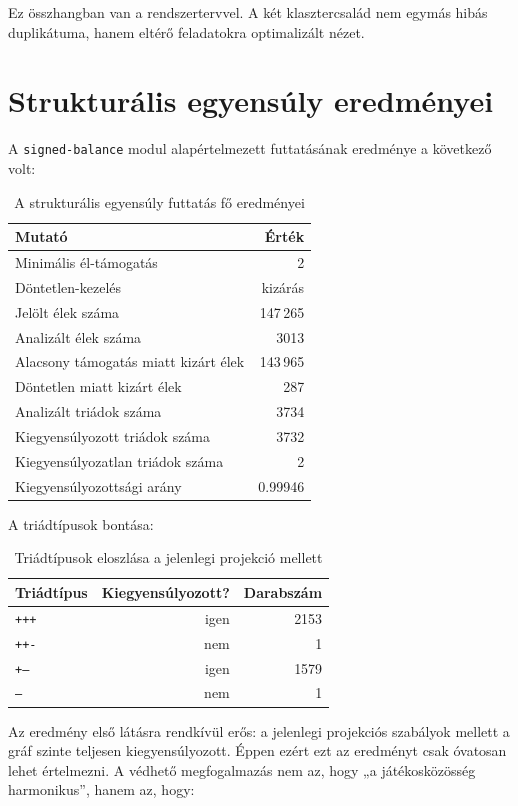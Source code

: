 \documentclass[a4paper,12pt]{report}
\begin{document}
Ez összhangban van a rendszertervvel. A két klasztercsalád nem egymás hibás duplikátuma, hanem eltérő feladatokra optimalizált nézet.

\section{Strukturális egyensúly eredményei}

A \texttt{signed-balance} modul alapértelmezett futtatásának eredménye a következő volt:

\begin{table}[H]
\centering
\caption{A strukturális egyensúly futtatás fő eredményei}
\begin{tabular}{lr}
\toprule
\textbf{Mutató} & \textbf{Érték} \\
\midrule
Minimális él-támogatás & 2 \\
Döntetlen-kezelés & kizárás \\
Jelölt élek száma & 147\,265 \\
Analizált élek száma & 3013 \\
Alacsony támogatás miatt kizárt élek & 143\,965 \\
Döntetlen miatt kizárt élek & 287 \\
Analizált triádok száma & 3734 \\
Kiegyensúlyozott triádok száma & 3732 \\
Kiegyensúlyozatlan triádok száma & 2 \\
Kiegyensúlyozottsági arány & 0.99946 \\
\bottomrule
\end{tabular}
\end{table}

A triádtípusok bontása:

\begin{table}[H]
\centering
\caption{Triádtípusok eloszlása a jelenlegi projekció mellett}
\begin{tabular}{lrr}
\toprule
\textbf{Triádtípus} & \textbf{Kiegyensúlyozott?} & \textbf{Darabszám} \\
\midrule
\texttt{+++} & igen & 2153 \\
\texttt{++-} & nem & 1 \\
\texttt{+--} & igen & 1579 \\
\texttt{---} & nem & 1 \\
\bottomrule
\end{tabular}
\end{table}

Az eredmény első látásra rendkívül erős: a jelenlegi projekciós szabályok mellett a gráf szinte teljesen kiegyensúlyozott. Éppen ezért ezt az eredményt csak óvatosan lehet értelmezni. A védhető megfogalmazás nem az, hogy „a játékosközösség harmonikus”, hanem az, hogy:
\end{document}
